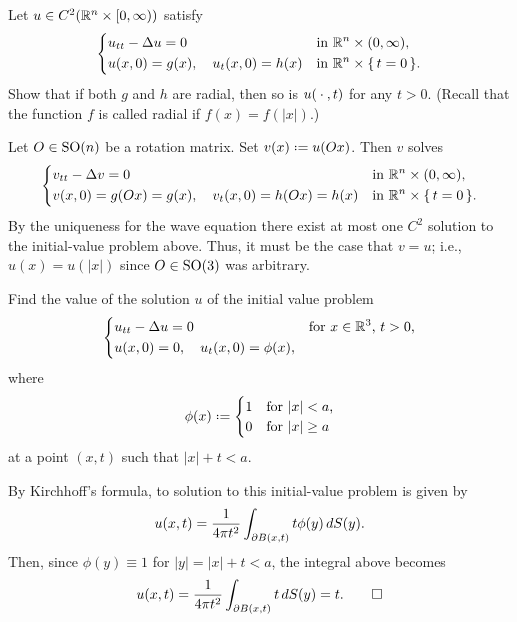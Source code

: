 \begin{problem}
  Let \(u\in C^2(\mathbb{R}^n\times[0,\infty))\) satisfy
  \[
    \left\{
      \begin{aligned}
        &u_{tt}-\Delta u=0&&\text{in \(\mathbb{R}^n\times(0,\infty),\)}\\
        &u(x,0)=g(x),\quad u_t(x,0)=h(x)&&\text{in \(\mathbb{R}^n\times\{\,t=0\,\}\).}
      \end{aligned}
    \right.
  \]
  Show that if both \(g\) and \(h\) are radial, then so is \(u({}\cdot{},t)\)
  for any \(t>0\). (Recall that the function \(f\) is called radial if
  \(f(x)=f(|x|)\).)
\end{problem}
\begin{solution*}
  Let \(O\in\operatorname{SO}(n)\) be a rotation matrix. Set \(v(x)\defeq u(Ox)\). Then
  \(v\) solves
  \[
    \left\{
      \begin{aligned}
        &v_{tt}-\Delta v=0&&\text{in \(\mathbb{R}^n\times(0,\infty),\)}\\
        &v(x,0)=g(Ox)=g(x),\quad v_t(x,0)=h(Ox)=h(x)&&\text{in
          \(\mathbb{R}^n\times\{\,t=0\,\}\).}
      \end{aligned}
    \right.
  \]
  By the uniqueness for the wave equation there exist at most one \(C^2\)
  solution to the initial-value problem above. Thus, it must be the case
  that \(v=u\); i.e., \(u(x)=u(|x|)\) since \(O\in\operatorname{SO}(3)\) was arbitrary.
\end{solution*}

\begin{problem}
  Find the value of the solution \(u\) of the initial value problem
  \[
    \left\{
      \begin{aligned}
        &u_{tt}-\Lap u=0&&\text{for \(x\in\R^3\), \(t>0\),}\\
        &u(x,0)=0,\quad u_t(x,0)=\phi(x),
      \end{aligned}
    \right.
  \]
  where
  \[
    \phi(x)\defeq
    \begin{cases}
      1&\text{for \(|x|<a\),}\\
      0&\text{for \(|x|\geq a\)}
    \end{cases}
  \]
  at a point \((x,t)\) such that \(|x|+t<a\).
\end{problem}
\begin{solution*}
  By Kirchhoff's formula, to solution to this initial-value problem is
  given by
  \[
    u(x,t)=\frac{1}{4\pi t^2}\int_{\partial B(x,t)} t\phi(y)\diff S(y).
  \]
  Then, since \(\phi(y)\equiv 1\) for \(|y|=|x|+t<a\), the integral above
  becomes
  \[
    u(x,t)=\frac{1}{4\pi t^2}\int_{\partial B(x,t)} t\mathop{}\!d S(y)=t.\qedhere
  \]
\end{solution*}

